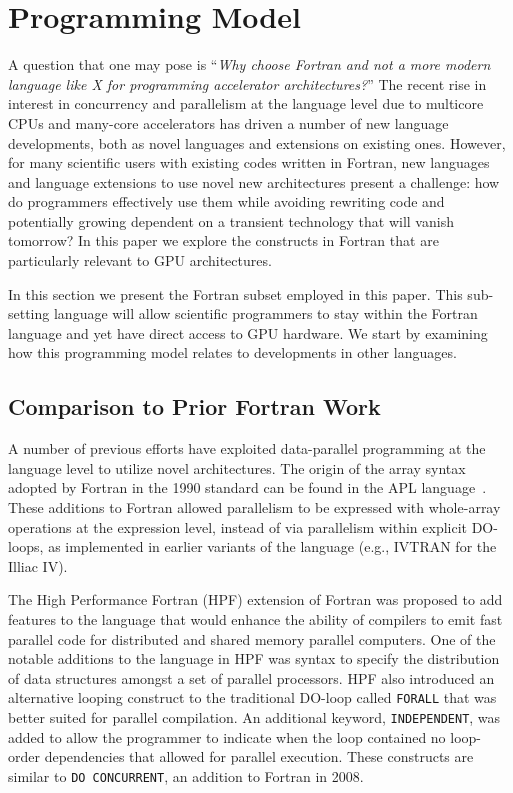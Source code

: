 \section{Programming Model}

A question that one may pose is ``\emph{Why choose Fortran and not a
  more modern language like X for programming accelerator
  architectures?}''  The recent rise in interest in concurrency and
parallelism at the language level due to multicore CPUs and
many-core accelerators has driven a number of new language
developments, both as novel languages and extensions on existing ones.
However, for many scientific users with existing codes written in
Fortran, new languages and language extensions to use novel new
architectures present a challenge: how do programmers effectively use
them while avoiding rewriting code and potentially growing dependent
on a transient technology that will vanish tomorrow?  In this paper we
explore the constructs in Fortran that are particularly relevant to
GPU architectures.

In this section we present the Fortran subset employed in this paper.
This sub-setting language will allow scientific programmers to stay
within the Fortran language and yet have direct access to GPU
hardware.  We start by examining how this programming model relates to
developments in other languages.


\subsection{Comparison to Prior Fortran Work}



A number of previous efforts have exploited data-parallel programming
at the language level to utilize novel architectures.  The origin of
the array syntax adopted by Fortran in the 1990 standard can be found
in the APL language~\citep{iverson79apl}.  These additions to Fortran
allowed parallelism to be expressed with whole-array operations at the
expression level, instead of via parallelism within explicit DO-loops,
as implemented in earlier variants of the language (e.g., IVTRAN for the
Illiac IV).

The High Performance Fortran (HPF) extension of Fortran was proposed
to add features to the language that would enhance the ability of
compilers to emit fast parallel code for distributed and shared memory
parallel computers\citep{koelbel94hpf}.  One of the notable additions
to the language in HPF was syntax to specify the distribution of data
structures amongst a set of parallel processors.  HPF also introduced
an alternative looping construct to the traditional DO-loop called
{\tt FORALL} that was better suited for parallel compilation.  An
additional keyword, {\tt INDEPENDENT}, was added to allow the
programmer to indicate when the loop contained no loop-order
dependencies that allowed for parallel execution.  These constructs
are similar to {\tt DO CONCURRENT}, an addition to Fortran in 2008.

